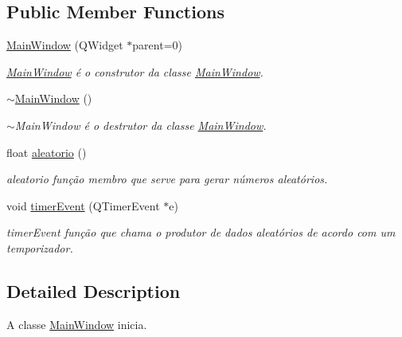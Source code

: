 \subsection*{Public Member Functions}
\begin{DoxyCompactItemize}
\item 
\mbox{\label{class_main_window_a8b244be8b7b7db1b08de2a2acb9409db}} 
\mbox{\hyperlink{class_main_window_a8b244be8b7b7db1b08de2a2acb9409db}{Main\+Window}} (Q\+Widget $\ast$parent=0)
\begin{DoxyCompactList}\small\item\em \mbox{\hyperlink{class_main_window}{Main\+Window}} é o construtor da classe \mbox{\hyperlink{class_main_window}{Main\+Window}}. \end{DoxyCompactList}\item 
\mbox{\label{class_main_window_ae98d00a93bc118200eeef9f9bba1dba7}} 
\mbox{\hyperlink{class_main_window_ae98d00a93bc118200eeef9f9bba1dba7}{$\sim$\+Main\+Window}} ()
\begin{DoxyCompactList}\small\item\em $\sim$\+Main\+Window é o destrutor da classe \mbox{\hyperlink{class_main_window}{Main\+Window}}. \end{DoxyCompactList}\item 
float \mbox{\hyperlink{class_main_window_ab29e2b2ee8118c9d36c45820309a9093}{aleatorio}} ()
\begin{DoxyCompactList}\small\item\em aleatorio função membro que serve para gerar números aleatórios. \end{DoxyCompactList}\item 
\mbox{\label{class_main_window_a9d08a694a5f9c532225754381b8011ea}} 
void \mbox{\hyperlink{class_main_window_a9d08a694a5f9c532225754381b8011ea}{timer\+Event}} (Q\+Timer\+Event $\ast$e)
\begin{DoxyCompactList}\small\item\em timer\+Event função que chama o produtor de dados aleatórios de acordo com um temporizador. \end{DoxyCompactList}\end{DoxyCompactItemize}


\subsection{Detailed Description}
A classe \mbox{\hyperlink{class_main_window}{Main\+Window}} inicia. 

